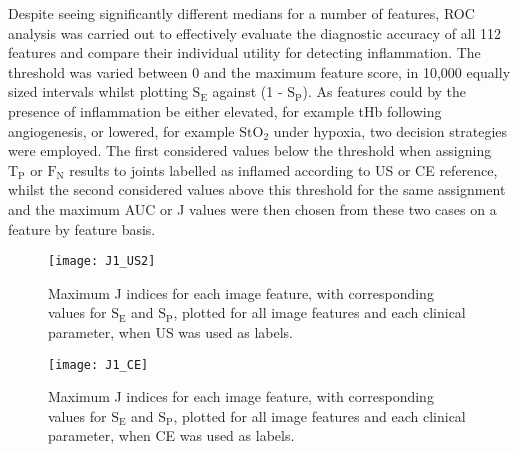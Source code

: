 \documentclass[twoside]{bhamthesis}
\theoremstyle{definition}
\begin{document}
Despite seeing significantly different medians for a number of features, ROC analysis was carried out to effectively evaluate the diagnostic accuracy of all 112 features and compare their individual utility for detecting inflammation. The threshold was varied between 0 and the maximum feature score, in 10,000 equally sized intervals whilst plotting $\mathrm{S_E}$ against (1 - $\mathrm{S_P}$). As features could by the presence of inflammation be either elevated, for example tHb following angiogenesis, or lowered, for example $\mathrm{StO_2}$ under hypoxia, two decision strategies were employed. The first considered values below the threshold when assigning $\mathrm{T_P}$ or $\mathrm{F_N}$ results to joints labelled as inflamed according to US or CE reference, whilst the second considered values above this threshold for the same assignment and the maximum AUC or J values were then chosen from these two cases on a feature by feature basis.

\begin{figure}[!ht]
\centering\texttt{[image: J1\_US2]}\caption{Maximum J indices for each image feature, with corresponding values for $\mathrm{S_E}$ and $\mathrm{S_P}$, plotted for all image features and each clinical parameter, when  US was used as labels.}
\label{fig:J1_US}
\end{figure}

\begin{figure}[!ht]
\centering\texttt{[image: J1\_CE]}\caption{Maximum J indices for each image feature, with corresponding values for $\mathrm{S_E}$ and $\mathrm{S_P}$, plotted for all image features and each clinical parameter, when  CE was used as labels.}
\label{fig:J1_CE}
\end{figure}
\end{document}
